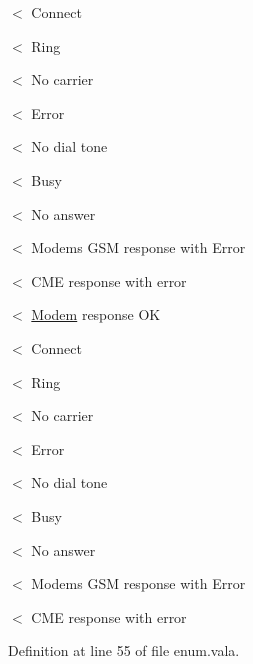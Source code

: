 $<$ Connect

$<$ Ring

$<$ No carrier

$<$ Error

$<$ No dial tone

$<$ Busy

$<$ No answer

$<$ Modems G\-S\-M response with Error

$<$ C\-M\-E response with error

$<$ \hyperlink{classedwinspire_1_1_ports_1_1_modem}{Modem} response O\-K

$<$ Connect

$<$ Ring

$<$ No carrier

$<$ Error

$<$ No dial tone

$<$ Busy

$<$ No answer

$<$ Modems G\-S\-M response with Error

$<$ C\-M\-E response with error 

Definition at line 55 of file enum.\-vala.

